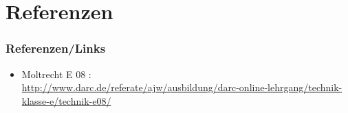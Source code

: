 %

\section*{Referenzen}
\begin{frame}
    \frametitle{Referenzen/Links}
    
    \footnotesize
    \begin{itemize}
        \item Moltrecht E 08 : \\
              \url{http://www.darc.de/referate/ajw/ausbildung/darc-online-lehrgang/technik-klasse-e/technik-e08/}      
    \end{itemize}

\end{frame}



